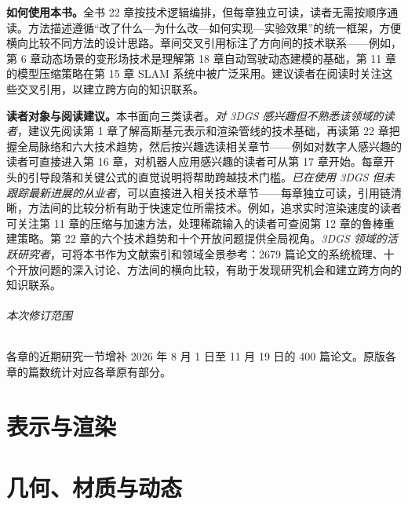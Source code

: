 \textbf{如何使用本书。}全书 22 章按技术逻辑编排，但每章独立可读，读者无需按顺序通读。方法描述遵循``改了什么—为什么改—如何实现—实验效果''的统一框架，方便横向比较不同方法的设计思路。章间交叉引用标注了方向间的技术联系——例如，第 6 章动态场景的变形场技术是理解第 18 章自动驾驶动态建模的基础，第 11 章的模型压缩策略在第 15 章 SLAM 系统中被广泛采用。建议读者在阅读时关注这些交叉引用，以建立跨方向的知识联系。

\textbf{读者对象与阅读建议。}本书面向三类读者。\emph{对 3DGS 感兴趣但不熟悉该领域的读者}，建议先阅读第 1 章了解高斯基元表示和渲染管线的技术基础，再读第 22 章把握全局脉络和六大技术趋势，然后按兴趣选读相关章节——例如对数字人感兴趣的读者可直接进入第 16 章，对机器人应用感兴趣的读者可从第 17 章开始。每章开头的引导段落和关键公式的直觉说明将帮助跨越技术门槛。\emph{已在使用 3DGS 但未跟踪最新进展的从业者}，可以直接进入相关技术章节——每章独立可读，引用链清晰，方法间的比较分析有助于快速定位所需技术。例如，追求实时渲染速度的读者可关注第 11 章的压缩与加速方法，处理稀疏输入的读者可查阅第 12 章的鲁棒重建策略。第 22 章的六个技术趋势和十个开放问题提供全局视角。\emph{3DGS 领域的活跃研究者}，可将本书作为文献索引和领域全景参考：2679 篇论文的系统梳理、十个开放问题的深入讨论、方法间的横向比较，有助于发现研究机会和建立跨方向的知识联系。

\paragraph*{本次修订范围}
各章的近期研究一节增补 2026 年 8 月 1 日至 11 月 19 日的 400 篇论文。原版各章的篇数统计对应各章原有部分。

\mainmatter
\pagestyle{techbook}

\part{表示与渲染}






\part{几何、材质与动态}


